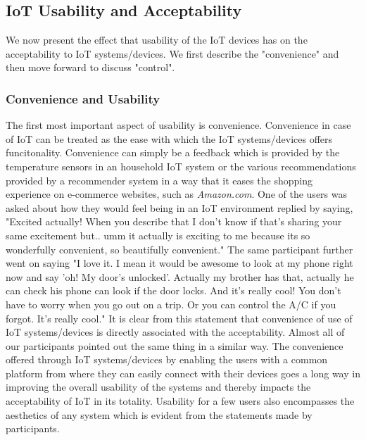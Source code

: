 \subsection{IoT Usability and Acceptability}
We now present the effect that usability of the IoT devices has on the acceptability to IoT systems/devices. We first describe the "convenience" and then move forward to discuss "control".

\subsubsection{Convenience and Usability}
The first most important aspect of usability is convenience. Convenience in case of IoT can be treated as the ease with which the IoT systems/devices offers funcitonality. Convenience can simply be a feedback which is provided by the temperature sensors in an household IoT system or the various recommendations provided by a recommender system in a way that it eases the shopping experience on e-commerce websites, such as \textit{Amazon.com}. One of the users was asked about how they would feel being in an IoT environment replied by saying, "Excited actually! When you describe that I don't know if that's sharing your same excitement but.. umm it actually is exciting to me because its so wonderfully convenient, so beautifully convenient." The same participant further went on saying "I love it. I mean it would be awesome to look at my phone right now and say 'oh! My door's unlocked'. Actually my brother has that, actually he can check his phone can look if the door locks. And it's really cool! You don't have to worry when you go out on a trip. Or you can control the A/C if you forgot. It's really cool."  It is clear from this statement that convenience of use of IoT systems/devices is directly associated with the acceptability. Almost all of our participants pointed out the same thing in a similar way. The convenience offered through IoT systems/devices by enabling the users with a common platform from where they can easily connect with their devices goes a long way in improving the overall usability of the systems and thereby impacts the acceptability of IoT in its totality. Usability for a few users also encompasses the aesthetics of any system which is evident from the statements made by participants.

